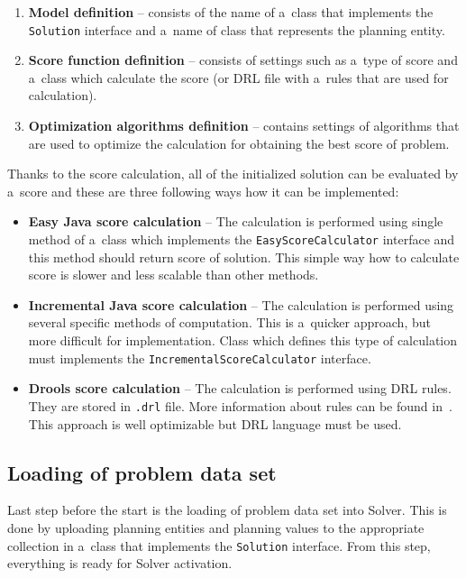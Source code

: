 \begin{enumerate}
    \item \textbf{Model definition} -- consists of the name of a~class that implements the \texttt{Solution} interface
    and a~name of class that represents the planning entity.
    \item \textbf{Score function definition} -- consists of settings such as a~type of score and a~class which calculate
    the score (or DRL file with a~rules that are used for calculation).
    \item \textbf{Optimization algorithms definition} -- contains settings of algorithms that are used to optimize the
    calculation for obtaining the best score of problem.
\end{enumerate}

Thanks to the score calculation, all of the initialized solution can be evaluated by a~score and these are three
following ways how it can be implemented:

\begin{itemize}
    \item \textbf{Easy Java score calculation} -- The calculation is performed using single method of a~class which
    implements the \texttt{EasyScoreCalculator} interface and this method should return score of solution. This simple
    way how to calculate score is slower and less scalable than other methods.
    \item \textbf{Incremental Java score calculation} -- The calculation is performed using several specific methods of
    computation. This is a~quicker approach, but more difficult for implementation. Class which defines this type of
    calculation must implements the \texttt{IncrementalScoreCalculator} interface.
    \item \textbf{Drools score calculation} -- The calculation is performed using DRL rules. They are stored in
    \texttt{.drl} file. More information about rules can be found in~\cite{DroolsBook, Drools}. This approach is well
    optimizable but DRL language must be used.
\end{itemize}

\subsection{Loading of problem data set}
Last step before the start is the loading of problem data set into Solver. This is done by uploading planning entities
and planning values to the appropriate collection in a~class that implements the \texttt{Solution} interface. From this
step, everything is ready for Solver activation.


